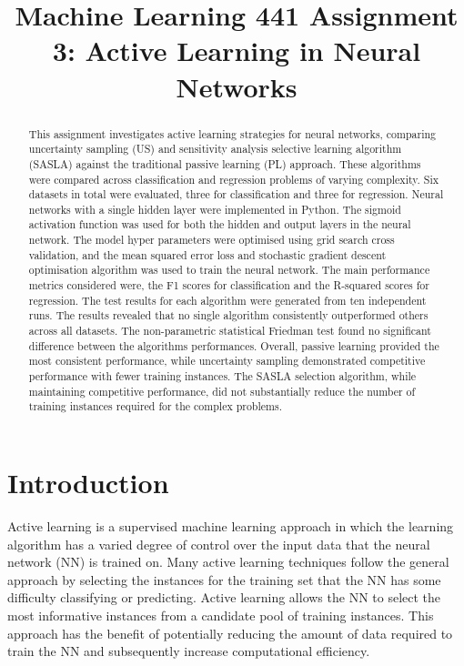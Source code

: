 \documentclass[conference]{IEEEtran}
\begin{document}
	
	\title{Machine Learning 441 Assignment 3: Active Learning in Neural Networks}
	\author{
	}
	\maketitle
	
	\begin{abstract}
	This assignment investigates active learning strategies for neural networks, comparing uncertainty sampling (US) and sensitivity analysis selective learning algorithm (SASLA) against the traditional passive learning (PL) approach. These algorithms were compared across classification and regression problems of varying complexity. Six datasets in total were evaluated, three for classification and three for regression. Neural networks with a single hidden layer were implemented in Python. The sigmoid activation function was used for both the hidden and output layers in the neural network. The model hyper parameters were optimised using grid search cross validation, and the mean squared error loss and stochastic gradient descent optimisation algorithm was used to train the neural network. The main performance metrics considered were, the F1 scores for classification and the R-squared scores for regression. The test results for each algorithm were generated from ten independent runs. The results revealed that no single algorithm consistently outperformed others across all datasets. The non-parametric statistical Friedman test found no significant difference between the algorithms performances. Overall, passive learning provided the most consistent performance, while uncertainty sampling demonstrated competitive performance with fewer training instances. The SASLA selection algorithm, while maintaining competitive performance, did not substantially reduce the number of training instances required for the complex problems.
	\end{abstract}
	
	\section{Introduction}
	Active learning is a supervised machine learning approach in which the learning algorithm has a varied degree of control over the input data that the neural network (NN) is trained on. Many active learning techniques follow the general approach by selecting the instances for the training set that the NN has some difficulty classifying or predicting. Active learning allows the NN to select the most informative instances from a candidate pool of training instances. This approach has the benefit of potentially reducing the amount of data required to train the NN and subsequently increase computational efficiency.
	
\end{document}
